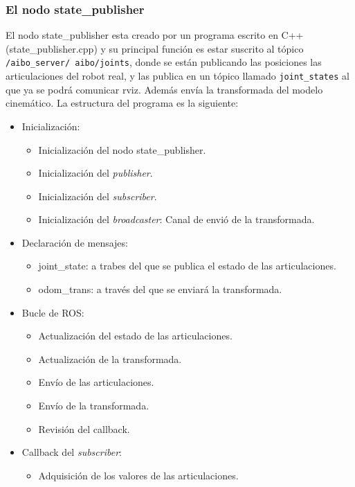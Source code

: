 \documentclass[12pt,a4paper,final,twoside]{article}
\begin{document}
\subsubsection{El nodo state{\_}publisher}\label{nodoSP}
El nodo state{\_}publisher esta creado por un programa escrito en C++ (state{\_}publisher.cpp) y su principal función es estar suscrito al tópico \texttt{/aibo{\_}server/ aibo/joints}, donde se están publicando las posiciones las articulaciones del robot real, y las publica en un tópico llamado \texttt{joint{\_}states} al que ya se podrá comunicar rviz. Además envía la transformada del modelo cinemático.
La estructura del programa es la siguiente:
\begin{itemize}
\item Inicialización:
\begin{itemize}
\item Inicialización del nodo state{\_}publisher.
\item Inicialización del \textit{publisher}.
\item Inicialización del \textit{subscriber}.
\item Inicialización del \textit{broadcaster}: Canal de envió de la transformada. 
\end{itemize}
\item Declaración de mensajes:
\begin{itemize}
\item joint{\_}state: a trabes del que se publica el estado de las articulaciones.
\item odom{\_}trans: a través del que se enviará la transformada.
\end{itemize}
\item Bucle de ROS:
\begin{itemize}
\item Actualización del estado de las articulaciones.
\item Actualización de la transformada.
\item Envío de las articulaciones.
\item Envío de la transformada.
\item Revisión del callback. 
\end{itemize}
\item Callback del \textit{subscriber}:
\begin{itemize}
\item Adquisición de los valores de las articulaciones.
\end{itemize}
\end{itemize}
\end{document}
